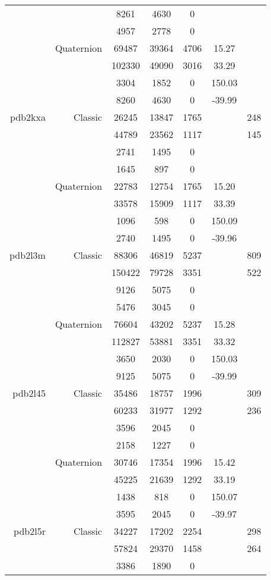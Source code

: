 \begin{xltabular}{\textwidth}{r|rcccSc}
& & 8261 & 4630 & 0 & & \\
& & 4957 & 2778 & 0 & & \\
& Quaternion & 69487 & 39364 & 4706 & 15.27 & \\
& & 102330 & 49090 & 3016 & 33.29 & \\
& & 3304 & 1852 & 0 & 150.03 & \\
& & 8260 & 4630 & 0 & -39.99 & \\ \addlinespace
pdb2kxa & Classic & 26245 & 13847 & 1765 & & 248 \\
& & 44789 & 23562 & 1117 & & 145 \\
& & 2741 & 1495 & 0 & & \\
& & 1645 & 897 & 0 & & \\
& Quaternion & 22783 & 12754 & 1765 & 15.20 & \\
& & 33578 & 15909 & 1117 & 33.39 & \\
& & 1096 & 598 & 0 & 150.09 & \\
& & 2740 & 1495 & 0 & -39.96 & \\ \addlinespace
pdb2l3m & Classic & 88306 & 46819 & 5237 & & 809 \\
& & 150422 & 79728 & 3351 & & 522 \\
& & 9126 & 5075 & 0 & & \\
& & 5476 & 3045 & 0 & & \\
& Quaternion & 76604 & 43202 & 5237 & 15.28 & \\
& & 112827 & 53881 & 3351 & 33.32 & \\
& & 3650 & 2030 & 0 & 150.03 & \\
& & 9125 & 5075 & 0 & -39.99 & \\ \addlinespace
pdb2l45 & Classic & 35486 & 18757 & 1996 & & 309 \\
& & 60233 & 31977 & 1292 & & 236 \\
& & 3596 & 2045 & 0 & & \\
& & 2158 & 1227 & 0 & & \\
& Quaternion & 30746 & 17354 & 1996 & 15.42 & \\
& & 45225 & 21639 & 1292 & 33.19 & \\
& & 1438 & 818 & 0 & 150.07 & \\
& & 3595 & 2045 & 0 & -39.97 & \\ \addlinespace
pdb2l5r & Classic & 34227 & 17202 & 2254 & & 298 \\
& & 57824 & 29370 & 1458 & & 264 \\
& & 3386 & 1890 & 0 & & \\

\end{xltabular}
